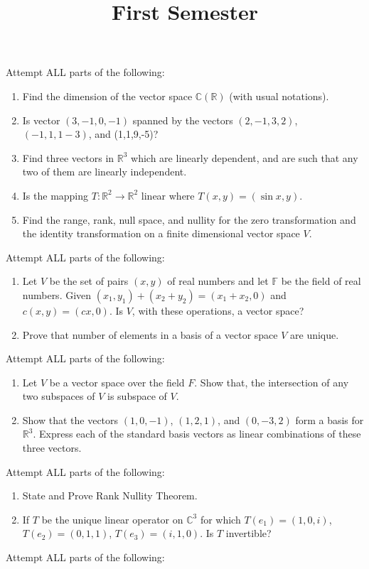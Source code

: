 \documentclass[11pt]{article}
\title{First Semester}
\newcommand{\F}{\mathbb{F}}
\newcommand{\R}{\mathbb{R}}
\newcommand{\C}{\mathbb{C}}
\begin{document}
 
\begin{questions}
\question Attempt ALL parts of the following: 
	\begin{enumerate}
	\item Find the dimension of the vector space $\C(\R)$ (with usual notations).
	
	\item Is vector $(3,-1,0,-1)$ spanned by the vectors $(2,-1,3,2)$, $(-1,1,1-3)$, and (1,1,9,-5)?
 \item Find three vectors in $\R^3$ which are linearly dependent, and are such that any two of them are linearly independent.
	\item Is the mapping $T: \R^2 \rightarrow \R^2$ linear where $T(x,y) = (\sin x, y)$.
	\item Find the range, rank, null space, and nullity for the zero transformation and the identity transformation on a finite dimensional vector space $V$.
	\end{enumerate}

\item Attempt ALL parts of the following: 
\begin{enumerate}
\item Let $V$ be the set of pairs $(x,y)$ of real numbers and let $\F$ be the field of real numbers. Given
$(x_1,y_1) + (x_2 + y_2) = (x_1+x_2 , 0) $ and $c(x,y) = (cx,0)$. Is $V$, with these operations, a vector space?
\item Prove that number of elements in a basis of a vector space $V$ are unique.
\end{enumerate}

\item Attempt ALL parts of the following: 
\begin{enumerate}
\item Let $V$ be a vector space over the field $F$. Show that, the intersection of any two subspaces of $V$ is subspace of $V$.
	\item Show that the vectors $(1,0,-1)$, $(1,2,1)$, and $(0,-3,2)$ form a basis for $\R^3$. Express each of the standard basis vectors as linear combinations of these three vectors.
\end{enumerate}

\item Attempt ALL parts of the following: 
\begin{enumerate}
\item State and Prove Rank Nullity Theorem.
	\item If $T$ be the unique linear operator on $\C^3$ for which $T(e_1)=(1,0,i)$, $T(e_2)=(0,1,1)$, ${T(e_3)=(i,1,0)}$. Is $T$ invertible?
\end{enumerate}
\item Attempt ALL parts of the following: 


\end{questions}
\end{document}
